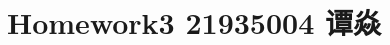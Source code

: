 \documentclass[a4paper]{book}
\makeatletter
\newcommand{\voidenvironment}[1]{%
  \expandafter\providecommand\csname env@#1@save@env\endcsname{}%
  \expandafter\providecommand\csname env@#1@process\endcsname{}%
  \@ifundefined{#1}{}{\RenewEnviron{#1}{}}%
}
\numberwithin{equation}{chapter}
\theoremstyle{definition}
\makeatother
\begin{document}
\pagestyle{empty}
%



\setcounter{chapter}{2}




\chapter{Homework3 21935004 谭焱}
\end{document}
